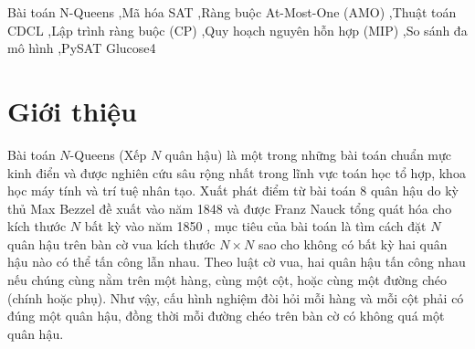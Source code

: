 \documentclass[a4paper,fleqn]{cas-sc}
\begin{document}
\begin{abstract}
Trong đối đầu đa mô hình, IBM CPLEX CP Optimizer chứng minh ưu thế thống trị tuyệt đối về tốc độ, giải quyết bài toán kích thước cực đại $N = 1000$ chỉ trong $0{,}250$ giây nhờ thuật toán lan truyền lọc miền giá trị toàn cục của Régin trên ràng buộc $\text{AllDifferent}$. Bên cạnh đó, IBM CPLEX MIP thể hiện độ ổn định phi thường khi giải thành công mốc $N = 1000$ trong $19{,}42$ giây, trong khi Gurobi đạt tốc độ cực nhanh ở miền kích thước trung bình và lớn đến $N = 729$ ($24{,}10$ giây) trước khi chạm ngưỡng timeout. Đáng chú ý, PySAT Glucose4 với mã hóa Commander Variable đã vượt qua cả Gurobi lẫn OR-Tools CP-SAT tại mốc $N = 1000$, khẳng định rằng các bộ giải SAT CDCL hiện đại khi kết hợp cùng kỹ thuật mã hóa ràng buộc tối ưu hoàn toàn đủ năng lực cạnh tranh sòng phẳng hoặc vượt trội so với các bộ giải thương mại đắt giá trên các bài toán thỏa mãn ràng buộc quy mô hàng triệu biến.
\end{abstract}

\begin{keywords}
Bài toán N-Queens \sep Mã hóa SAT \sep Ràng buộc At-Most-One (AMO) \sep Thuật toán CDCL \sep Lập trình ràng buộc (CP) \sep Quy hoạch nguyên hỗn hợp (MIP) \sep So sánh đa mô hình \sep PySAT Glucose4
\end{keywords}

\maketitle

\section{Giới thiệu}
\label{sec:intro}

Bài toán $N$-Queens (Xếp $N$ quân hậu) là một trong những bài toán chuẩn mực kinh điển và được nghiên cứu sâu rộng nhất trong lĩnh vực toán học tổ hợp, khoa học máy tính và trí tuệ nhân tạo. Xuất phát điểm từ bài toán 8 quân hậu do kỳ thủ Max Bezzel đề xuất vào năm 1848 \cite{bezzel1848} và được Franz Nauck tổng quát hóa cho kích thước $N$ bất kỳ vào năm 1850 \cite{nauck1850}, mục tiêu của bài toán là tìm cách đặt $N$ quân hậu trên bàn cờ vua kích thước $N \times N$ sao cho không có bất kỳ hai quân hậu nào có thể tấn công lẫn nhau. Theo luật cờ vua, hai quân hậu tấn công nhau nếu chúng cùng nằm trên một hàng, cùng một cột, hoặc cùng một đường chéo (chính hoặc phụ). Như vậy, cấu hình nghiệm đòi hỏi mỗi hàng và mỗi cột phải có đúng một quân hậu, đồng thời mỗi đường chéo trên bàn cờ có không quá một quân hậu.
\end{document}
